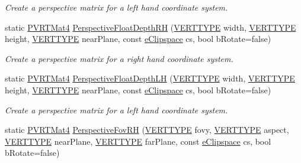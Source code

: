 \begin{DoxyCompactItemize}
\begin{DoxyCompactList}\small\item\em Create a perspective matrix for a left hand coordinate system. \end{DoxyCompactList}\item 
static \hyperlink{struct_p_v_r_t_mat4}{P\+V\+R\+T\+Mat4} \hyperlink{struct_p_v_r_t_mat4_aeb86157260434c156c03bcd0ec5b0fbf}{Perspective\+Float\+Depth\+R\+H} (\hyperlink{group___a_p_i___o_g_l_e_s_ga06da457b7d3e93368ab904f89e1396be}{V\+E\+R\+T\+T\+Y\+P\+E} width, \hyperlink{group___a_p_i___o_g_l_e_s_ga06da457b7d3e93368ab904f89e1396be}{V\+E\+R\+T\+T\+Y\+P\+E} height, \hyperlink{group___a_p_i___o_g_l_e_s_ga06da457b7d3e93368ab904f89e1396be}{V\+E\+R\+T\+T\+Y\+P\+E} near\+Plane, const \hyperlink{struct_p_v_r_t_mat4_aad804cddb0d3f6799550aaa703d71e96}{e\+Clipspace} cs, bool b\+Rotate=false)
\begin{DoxyCompactList}\small\item\em Create a perspective matrix for a right hand coordinate system. \end{DoxyCompactList}\item 
static \hyperlink{struct_p_v_r_t_mat4}{P\+V\+R\+T\+Mat4} \hyperlink{struct_p_v_r_t_mat4_a122c19ab609d39de3a36faaaed7c49e9}{Perspective\+Float\+Depth\+L\+H} (\hyperlink{group___a_p_i___o_g_l_e_s_ga06da457b7d3e93368ab904f89e1396be}{V\+E\+R\+T\+T\+Y\+P\+E} width, \hyperlink{group___a_p_i___o_g_l_e_s_ga06da457b7d3e93368ab904f89e1396be}{V\+E\+R\+T\+T\+Y\+P\+E} height, \hyperlink{group___a_p_i___o_g_l_e_s_ga06da457b7d3e93368ab904f89e1396be}{V\+E\+R\+T\+T\+Y\+P\+E} near\+Plane, const \hyperlink{struct_p_v_r_t_mat4_aad804cddb0d3f6799550aaa703d71e96}{e\+Clipspace} cs, bool b\+Rotate=false)
\begin{DoxyCompactList}\small\item\em Create a perspective matrix for a left hand coordinate system. \end{DoxyCompactList}\item 
static \hyperlink{struct_p_v_r_t_mat4}{P\+V\+R\+T\+Mat4} \hyperlink{struct_p_v_r_t_mat4_a614e5b42b69d123e1969e33ad8ae0e81}{Perspective\+Fov\+R\+H} (\hyperlink{group___a_p_i___o_g_l_e_s_ga06da457b7d3e93368ab904f89e1396be}{V\+E\+R\+T\+T\+Y\+P\+E} fovy, \hyperlink{group___a_p_i___o_g_l_e_s_ga06da457b7d3e93368ab904f89e1396be}{V\+E\+R\+T\+T\+Y\+P\+E} aspect, \hyperlink{group___a_p_i___o_g_l_e_s_ga06da457b7d3e93368ab904f89e1396be}{V\+E\+R\+T\+T\+Y\+P\+E} near\+Plane, \hyperlink{group___a_p_i___o_g_l_e_s_ga06da457b7d3e93368ab904f89e1396be}{V\+E\+R\+T\+T\+Y\+P\+E} far\+Plane, const \hyperlink{struct_p_v_r_t_mat4_aad804cddb0d3f6799550aaa703d71e96}{e\+Clipspace} cs, bool b\+Rotate=false)

\end{DoxyCompactItemize}

